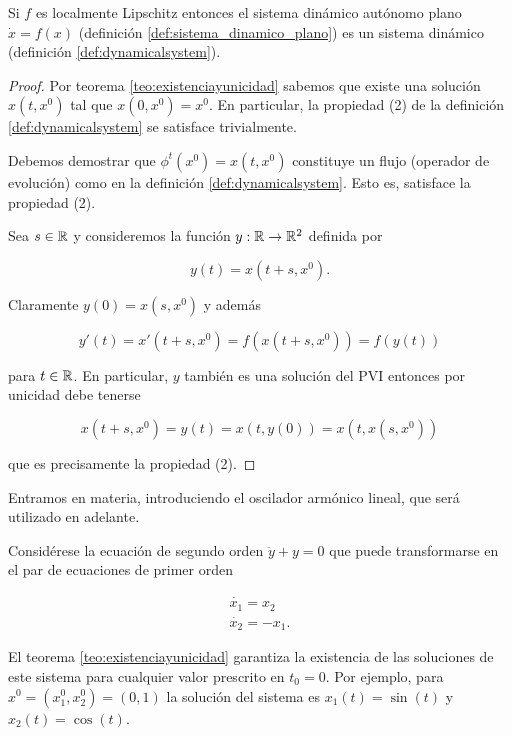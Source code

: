 \begin{proposition}Si $f$ es localmente Lipschitz entonces el sistema dinámico autónomo plano $\dot{x} = f(x)$ (definición \ref{def:sistema_dinamico_plano}) es un sistema dinámico (definición \ref{def:dynamicalsystem}).
\begin{proof}

Por teorema \ref{teo:existenciayunicidad} sabemos que existe una solución $x(t,x^0)$ tal que $x(0,x^0) = x^0$. En particular, la propiedad (2) de la definición \ref{def:dynamicalsystem} se satisface trivialmente.

Debemos demostrar que $\phi^t(x^0) = x(t,x^0)$ constituye un flujo (operador de evolución) como en la definición \ref{def:dynamicalsystem}. Esto es, satisface la propiedad (2).

Sea $s \in {\ensuremath{\mathbb{R}}}$ y consideremos la función $y: {\mathbb{R}} \to {\ensuremath{\mathbb{R}}}^2$ definida por 

$$ y(t) = x(t+s, x^0).$$

Claramente $y(0) = x(s,x^0)$ y además

$$ y'(t) = x'(t+s,x^0) = f(x(t+s, x^0)) = f(y(t))  $$

para $t \in {\ensuremath{\mathbb{R}}}$. En particular, $y$ también es una solución del PVI entonces por unicidad debe tenerse

$$ x(t+s,x^0) = y(t) = x(t, y(0)) = x(t, x(s,x^0))$$

que es precisamente la propiedad (2).
\end{proof}
\end{proposition}

Entramos en materia, introduciendo el oscilador armónico lineal, que será utilizado en adelante.

\begin{example} \label{ex:osciladorarmonico} Considérese la ecuación de segundo orden $\ddot{y} + y = 0$ que puede transformarse en el par de ecuaciones de primer orden

\begin{equation} \label{eq:osciladorarmonico}
	\begin{array}{l}
		\dot{x_1} = x_2 \\
		\dot{x_2} = -x_1.
	\end{array}
\end{equation}

El teorema \ref{teo:existenciayunicidad} garantiza la existencia de las soluciones de este sistema para cualquier valor prescrito en $t_0 = 0$. Por ejemplo, para $x^0 = (x_1^0,x_2^0) = (0,1)$ la solución del sistema es $x_1(t) = \sin(t)$ y $x_2(t) = \cos(t)$.
\end{example}

